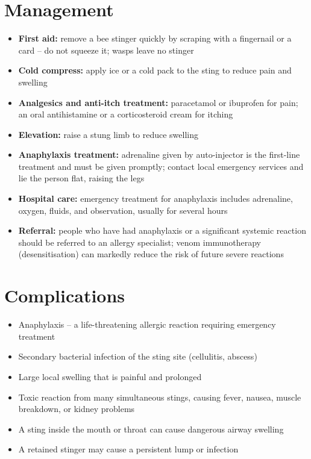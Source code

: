 \section*{Management}
\begin{itemize}
    \item \textbf{First aid:} remove a bee stinger quickly by scraping with a fingernail or a card -- do not squeeze it; wasps leave no stinger
    \item \textbf{Cold compress:} apply ice or a cold pack to the sting to reduce pain and swelling
    \item \textbf{Analgesics and anti-itch treatment:} paracetamol or ibuprofen for pain; an oral antihistamine or a corticosteroid cream for itching
    \item \textbf{Elevation:} raise a stung limb to reduce swelling
    \item \textbf{Anaphylaxis treatment:} adrenaline given by auto-injector is the first-line treatment and must be given promptly; contact local emergency services and lie the person flat, raising the legs
    \item \textbf{Hospital care:} emergency treatment for anaphylaxis includes adrenaline, oxygen, fluids, and observation, usually for several hours
    \item \textbf{Referral:} people who have had anaphylaxis or a significant systemic reaction should be referred to an allergy specialist; venom immunotherapy (desensitisation) can markedly reduce the risk of future severe reactions
\end{itemize}

\section*{Complications}
\begin{itemize}
    \item Anaphylaxis -- a life-threatening allergic reaction requiring emergency treatment
    \item Secondary bacterial infection of the sting site (cellulitis, abscess)
    \item Large local swelling that is painful and prolonged
    \item Toxic reaction from many simultaneous stings, causing fever, nausea, muscle breakdown, or kidney problems
    \item A sting inside the mouth or throat can cause dangerous airway swelling
    \item A retained stinger may cause a persistent lump or infection
\end{itemize}

